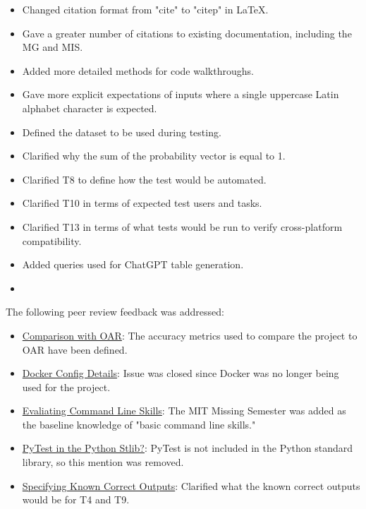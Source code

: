 \documentclass{article}
\begin{document}
\begin{itemize}
  \item Changed citation format from "cite" to "citep" in LaTeX.
  \item Gave a greater number of citations to existing documentation, including the MG and MIS.
  \item Added more detailed methods for code walkthroughs.
  \item Gave more explicit expectations of inputs where a single uppercase Latin alphabet character is expected.
  \item Defined the dataset to be used during testing.
  \item Clarified why the sum of the probability vector is equal to 1.
  \item Clarified T8 to define how the test would be automated.
  \item Clarified T10 in terms of expected test users and tasks.
  \item Clarified T13 in terms of what tests would be run to verify cross-platform compatibility.
  \item Added queries used for ChatGPT table generation.
  \item 
\end{itemize}

\noindent The following peer review feedback was addressed:

\begin{itemize}
  \item \href{https://github.com/ptrandev/OCRacle/issues/16}{Comparison with OAR}:
  The accuracy metrics used to compare the \progname{} project to OAR have been defined.
  \item \href{https://github.com/ptrandev/OCRacle/issues/15}{Docker Config Details}:
  Issue was closed since Docker was no longer being used for the project.
  \item \href{https://github.com/ptrandev/OCRacle/issues/14}{Evaliating Command Line Skills}:
  The MIT Missing Semester was added as the baseline knowledge of "basic command line skills."
  \item \href{https://github.com/ptrandev/OCRacle/issues/13}{PyTest in the Python Stlib?}:
  PyTest is not included in the Python standard library, so this mention was removed.
  \item \href{https://github.com/ptrandev/OCRacle/issues/12}{Specifying Known Correct Outputs}:
  Clarified what the known correct outputs would be for T4 and T9.
\end{itemize}
\end{document}
